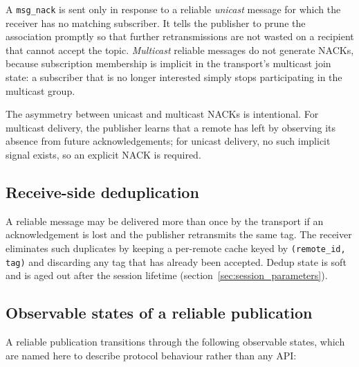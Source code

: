 A \texttt{msg\_nack} is sent only in response to a reliable \emph{unicast}
message for which the receiver has no matching subscriber. It tells the
publisher to prune the association promptly so that further retransmissions
are not wasted on a recipient that cannot accept the topic. \emph{Multicast}
reliable messages do not generate NACKs, because subscription membership is
implicit in the transport's multicast join state: a subscriber that is no
longer interested simply stops participating in the multicast group.

\begin{remark}
    The asymmetry between unicast and multicast NACKs is intentional. For
    multicast delivery, the publisher learns that a remote has left by
    observing its absence from future acknowledgements; for unicast delivery,
    no such implicit signal exists, so an explicit NACK is required.
\end{remark}

\subsection{Receive-side deduplication}

A reliable message may be delivered more than once by the transport if an
acknowledgement is lost and the publisher retransmits the same tag. The
receiver eliminates such duplicates by keeping a per-remote cache keyed by
\texttt{(remote\_id, tag)} and discarding any tag that has already been
accepted. Dedup state is soft and is aged out after the session lifetime
(section~\ref{sec:session_parameters}).

\subsection{Observable states of a reliable publication}

A reliable publication transitions through the following observable states,
which are named here to describe protocol behaviour rather than any API:

